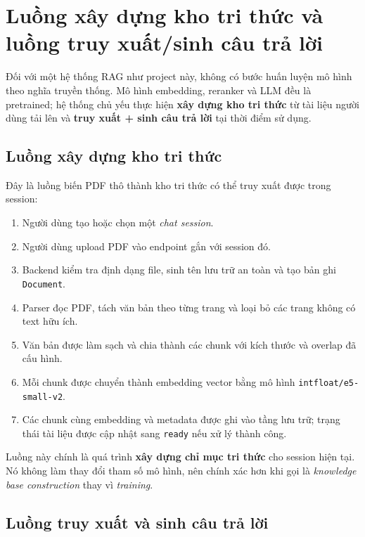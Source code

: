 \documentclass[12pt]{ai_conquer2026}
\begin{document}
\section{Luồng xây dựng kho tri thức và luồng truy xuất/sinh câu trả lời}

Đối với một hệ thống RAG như project này, không có bước huấn luyện mô hình theo nghĩa truyền thống. Mô hình embedding, reranker và LLM đều là pretrained; hệ thống chủ yếu thực hiện \textbf{xây dựng kho tri thức} từ tài liệu người dùng tải lên và \textbf{truy xuất + sinh câu trả lời} tại thời điểm sử dụng.

\subsection{Luồng xây dựng kho tri thức}

Đây là luồng biến PDF thô thành kho tri thức có thể truy xuất được trong session:

\begin{enumerate}
    \item Người dùng tạo hoặc chọn một \textit{chat session}.
    \item Người dùng upload PDF vào endpoint gắn với session đó.
    \item Backend kiểm tra định dạng file, sinh tên lưu trữ an toàn và tạo bản ghi \texttt{Document}.
    \item Parser đọc PDF, tách văn bản theo từng trang và loại bỏ các trang không có text hữu ích.
    \item Văn bản được làm sạch và chia thành các chunk với kích thước và overlap đã cấu hình.
    \item Mỗi chunk được chuyển thành embedding vector bằng mô hình \texttt{intfloat/e5-small-v2}.
    \item Các chunk cùng embedding và metadata được ghi vào tầng lưu trữ; trạng thái tài liệu được cập nhật sang \texttt{ready} nếu xử lý thành công.
\end{enumerate}

Luồng này chính là quá trình \textbf{xây dựng chỉ mục tri thức} cho session hiện tại. Nó không làm thay đổi tham số mô hình, nên chính xác hơn khi gọi là \textit{knowledge base construction} thay vì \textit{training}.

\subsection{Luồng truy xuất và sinh câu trả lời}
\end{document}
